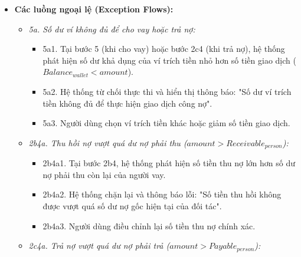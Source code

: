 \documentclass[11pt,a4paper]{article}
\providecommand{\tightlist}{
  \setlength{\itemsep}{0pt}\setlength{\parskip}{0pt}}
\begin{document}
\begin{itemize}
\begin{itemize}
    \begin{itemize}
    \tightlist
    \item
      2e1. Người dùng chọn chức năng "Sao kê công nợ theo cá nhân" và
      chọn một cá nhân đối tác cụ thể.
    \item
      2e2. Hệ thống lọc toàn bộ các bản ghi trong bảng \texttt{debt} có
      trường \texttt{person} tương ứng, sắp xếp theo trình tự thời gian
      tăng dần.
    \item
      2e3. Hệ thống tính số dư nợ lũy kế sau từng giao dịch và tổng hợp:
      Tổng cho vay, Tổng đã thu hồi, Dư nợ phải thu còn lại, Tổng đã
      vay, Tổng đã trả, Dư nợ phải trả còn lại.
    \item
      2e4. Hệ thống hiển thị bảng sao kê chi tiết phục vụ việc đối soát
      và thanh toán.
    \end{itemize}
  \end{itemize}
\item
  \textbf{Các luồng ngoại lệ (Exception Flows):}

  \begin{itemize}
  \tightlist
  \item
    \emph{5a. Số dư ví không đủ để cho vay hoặc trả nợ:}

    \begin{itemize}
    \tightlist
    \item
      5a1. Tại bước 5 (khi cho vay) hoặc bước 2c4 (khi trả nợ), hệ thống
      phát hiện số dư khả dụng của ví trích tiền nhỏ hơn số tiền giao
      dịch (\(Balance_{wallet} < amount\)).
    \item
      5a2. Hệ thống từ chối thực thi và hiển thị thông báo: "Số dư ví
      trích tiền không đủ để thực hiện giao dịch công nợ".
    \item
      5a3. Người dùng chọn ví trích tiền khác hoặc giảm số tiền giao
      dịch.
    \end{itemize}
  \item
    \emph{2b4a. Thu hồi nợ vượt quá dư nợ phải thu
    (\(amount > Receivable_{person}\)):}

    \begin{itemize}
    \tightlist
    \item
      2b4a1. Tại bước 2b4, hệ thống phát hiện số tiền thu nợ lớn hơn số
      dư nợ phải thu còn lại của người vay.
    \item
      2b4a2. Hệ thống chặn lại và thông báo lỗi: "Số tiền thu hồi không
      được vượt quá số dư nợ gốc hiện tại của đối tác".
    \item
      2b4a3. Người dùng điều chỉnh lại số tiền thu nợ chính xác.
    \end{itemize}
  \item
    \emph{2c4a. Trả nợ vượt quá dư nợ phải trả
    (\(amount > Payable_{person}\)):}


\end{itemize}
\end{itemize}
\end{document}
